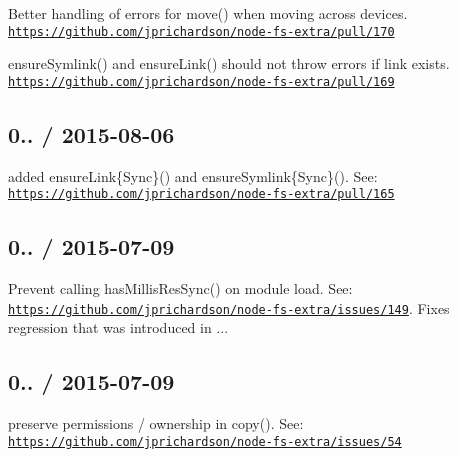 
\begin{DoxyItemize}
\item Better handling of errors for {\ttfamily move()} when moving across devices. \href{https://github.com/jprichardson/node-fs-extra/pull/170}{\tt https\+://github.\+com/jprichardson/node-\/fs-\/extra/pull/170}
\item {\ttfamily ensure\+Symlink()} and {\ttfamily ensure\+Link()} should not throw errors if link exists. \href{https://github.com/jprichardson/node-fs-extra/pull/169}{\tt https\+://github.\+com/jprichardson/node-\/fs-\/extra/pull/169}
\end{DoxyItemize}

\subsection*{0.. / 2015-\/08-\/06 }


\begin{DoxyItemize}
\item added {\ttfamily ensure\+Link\{Sync\}()} and {\ttfamily ensure\+Symlink\{Sync\}()}. See\+: \href{https://github.com/jprichardson/node-fs-extra/pull/165}{\tt https\+://github.\+com/jprichardson/node-\/fs-\/extra/pull/165}
\end{DoxyItemize}

\subsection*{0.. / 2015-\/07-\/09 }


\begin{DoxyItemize}
\item Prevent calling {\ttfamily has\+Millis\+Res\+Sync()} on module load. See\+: \href{https://github.com/jprichardson/node-fs-extra/issues/149}{\tt https\+://github.\+com/jprichardson/node-\/fs-\/extra/issues/149}. Fixes regression that was introduced in {..}.
\end{DoxyItemize}

\subsection*{0.. / 2015-\/07-\/09 }


\begin{DoxyItemize}
\item preserve permissions / ownership in {\ttfamily copy()}. See\+: \href{https://github.com/jprichardson/node-fs-extra/issues/54}{\tt https\+://github.\+com/jprichardson/node-\/fs-\/extra/issues/54}
\end{DoxyItemize}


